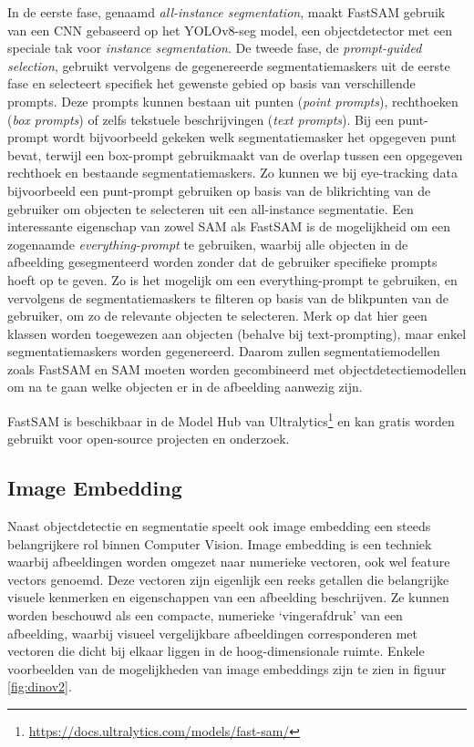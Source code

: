 In de eerste fase, genaamd \textit{all-instance segmentation}, maakt FastSAM gebruik van een CNN gebaseerd op het YOLOv8-seg model, een objectdetector met een speciale tak voor \textit{instance segmentation}. 
De tweede fase, de \textit{prompt-guided selection}, gebruikt vervolgens de gegenereerde segmentatiemaskers uit de eerste fase en selecteert specifiek het gewenste gebied op basis van verschillende prompts. 
Deze prompts kunnen bestaan uit punten (\textit{point prompts}), rechthoeken (\textit{box prompts}) of zelfs tekstuele beschrijvingen (\textit{text prompts}). 
Bij een punt-prompt wordt bijvoorbeeld gekeken welk segmentatiemasker het opgegeven punt bevat, terwijl een box-prompt gebruikmaakt van de overlap tussen een opgegeven rechthoek en bestaande segmentatiemaskers.
Zo kunnen we bij eye-tracking data bijvoorbeeld een punt-prompt gebruiken op basis van de blikrichting van de gebruiker om objecten te selecteren uit een all-instance segmentatie.
Een interessante eigenschap van zowel SAM als FastSAM is de mogelijkheid om een zogenaamde \textit{everything-prompt} te gebruiken, waarbij alle objecten in de afbeelding gesegmenteerd worden zonder dat de gebruiker specifieke prompts hoeft op te geven.
Zo is het mogelijk om een everything-prompt te gebruiken, en vervolgens de segmentatiemaskers te filteren op basis van de blikpunten van de gebruiker, om zo de relevante objecten te selecteren.
Merk op dat hier geen klassen worden toegewezen aan objecten (behalve bij text-prompting), maar enkel segmentatiemaskers worden gegenereerd.
Daarom zullen segmentatiemodellen zoals FastSAM en SAM moeten worden gecombineerd met objectdetectiemodellen om na te gaan welke objecten er in de afbeelding aanwezig zijn.

FastSAM is beschikbaar in de Model Hub van Ultralytics\footnote{\url{https://docs.ultralytics.com/models/fast-sam/}} en kan gratis worden gebruikt voor open-source projecten en onderzoek.

\subsection{Image Embedding}

Naast objectdetectie en segmentatie speelt ook image embedding een steeds belangrijkere rol binnen Computer Vision. 
Image embedding is een techniek waarbij afbeeldingen worden omgezet naar numerieke vectoren, ook wel feature vectors genoemd. 
Deze vectoren zijn eigenlijk een reeks getallen die belangrijke visuele kenmerken en eigenschappen van een afbeelding beschrijven. 
Ze kunnen worden beschouwd als een compacte, numerieke `vingerafdruk' van een afbeelding, waarbij visueel vergelijkbare afbeeldingen corresponderen met vectoren die dicht bij elkaar liggen in de hoog-dimensionale ruimte.
Enkele voorbeelden van de mogelijkheden van image embeddings zijn te zien in figuur \ref{fig:dinov2}.

